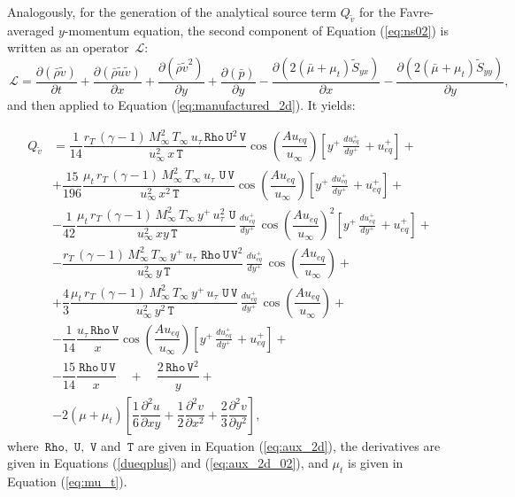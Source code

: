 \documentclass[10pt]{article}
\newcommand{\Diff}[2] {\dfrac{\partial( #1)}{\partial #2}}
\newcommand{\diff}[2] {\dfrac{\partial #1}{\partial #2}}
\newcommand{\Rho}{\,\mathtt{Rho}}
\newcommand{\U}{\,\mathtt{U}}
\newcommand{\V}{\,\mathtt{V}}
\newcommand{\T}{\,\mathtt{T}}
\newcommand{\Lo}{\,\mathcal{L}}
\newcommand{\Dueqplusyplus}{\, \frac{du_{eq}^+}{dy^+}\,}
\newcommand{\brho}{\bar{\rho}}
\newcommand{\bp}{\bar{p}}
\newcommand{\tu}{\tilde{u}}
\newcommand{\tv}{\tilde{v}}
\newcommand{\tS}{\tilde{S}}
\newcommand{\bmu}{\bar{\mu}}
\begin{document}
Analogously, for the generation of the analytical source term $Q_{\tv}$ for the Favre-averaged $y$-momentum equation, the second component of Equation  (\ref{eq:ns02})  is written as an  operator $\Lo$:
\begin{equation*}
 \Lo =\Diff{\brho \tv}{t} +\Diff{\brho \tu\tv}{x}+\Diff{\brho \tv^2}{y} +\Diff{\bp}{y}-\Diff{2(\bmu+\mu_t)\tS_{yx}}{x}-\Diff{2(\bmu+\mu_t)\tS_{yy}}{y},
\end{equation*}
and then applied to Equation  (\ref{eq:manufactured_2d}). It yields:

\begin{equation}
 \begin{split}
Q_{\tv} &= \dfrac{1}{14} \dfrac{r_T \, (\gamma-1) \,  M_{\infty}^2 \, T_{\infty} \, u_{\tau}\Rho \U^2 \V }{\, u_{\infty}^2 \, x \T}\cos\left(\dfrac{A u_{eq}}{u_{\infty}}\right)\left[y^{+} \Dueqplusyplus+u_{eq}^{+}\right]+ \\ 
&+\dfrac{15}{196} \dfrac{ \mu_t \, r_T \,(\gamma-1)\, M_{\infty}^2 \,T_{\infty} \, u_{\tau}\, \U \V }{\, u_{\infty}^2 \, x^2 \T}\cos\left(\dfrac{A u_{eq}}{u_{\infty}}\right) \left[y^{+} \Dueqplusyplus+u_{eq}^{+}\right] + \\ 
&-\dfrac{1}{42}\dfrac{ \mu_t \,r_T \, (\gamma-1) \,M_{\infty}^2 \,T_{\infty}\, y^{+} \,u_{\tau}^2 \, \U }{\, u_{\infty}^2 \, x y \T}\Dueqplusyplus\cos\left(\dfrac{A u_{eq}}{u_{\infty}}\right)^2 \left[y^{+} \Dueqplusyplus+u_{eq}^{+}\right] + \\ 
&-\dfrac{r_T \, (\gamma-1) \, M_{\infty}^2 \, T_{\infty} \,  y^{+} \, u_{\tau} \, \Rho \U \V^2 }{\, u_{\infty}^2 \, y \T} \Dueqplusyplus\cos\left(\dfrac{A u_{eq}}{u_{\infty}}\right)+ \\ 
&+\dfrac{4}{3}\dfrac{\mu_t \, r_T \, (\gamma-1) \, M_{\infty}^2 \,T_{\infty}\, y^{+} \,u_{\tau}\, \U \V}{\, u_{\infty}^2 \, y^2 \T}  \Dueqplusyplus\cos\left(\dfrac{A u_{eq}}{u_{\infty}}\right)+\\
&-\dfrac{1}{14}\dfrac{ u_{\tau} \Rho \V}{x} \cos\left(\dfrac{A u_{eq}}{u_{\infty}}\right) \left[y^{+} \Dueqplusyplus+u_{eq}^{+}\right]+\\
&-\dfrac{15}{14} \dfrac{\Rho \U \V}{x}\quad+\quad \dfrac{2 \Rho \V^2}{y}+\\
&-2( \mu+ \mu_t) \left[\dfrac{1}{6} \diff{^2u}{xy}+\dfrac{1}{2} \diff{^2v}{x^2}+\dfrac{2}{3} \diff{^2v}{y^2}\right],
 \end{split}
\end{equation}
where $\Rho,\,\U,\,\V$ and $\T$ are given in Equation (\ref{eq:aux_2d}), the derivatives are given in Equations (\ref{dueqplus}) and (\ref{eq:aux_2d_02}), and $\mu_t$ is given in Equation (\ref{eq:mu_t}).
\end{document}
